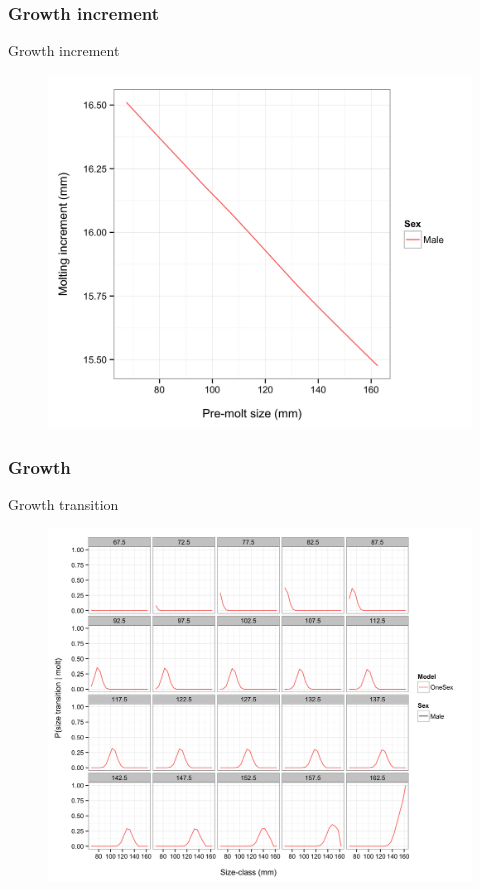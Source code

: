 \documentclass{beamer}
\begin{document}
\begin{frame}
\frametitle{Growth increment}
Growth increment
\begin{figure}[!htbp]
  \centering
  \includegraphics[width=0.75\linewidth]{../../examples/bbrkc/OneSex/figure/gi.png}
\end{figure}
\end{frame}


\begin{frame}
\frametitle{Growth}
Growth transition
\begin{figure}[!htbp]
  \centering
  \includegraphics[width=0.75\linewidth]{../../examples/bbrkc/OneSex/figure/growth_transition.png}
\end{figure}
\end{frame}

\end{document}
